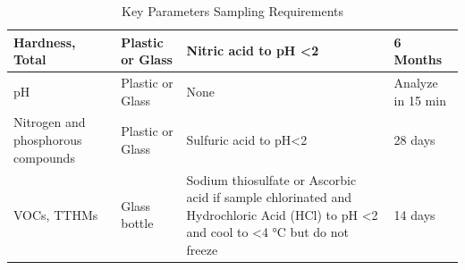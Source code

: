 \documentclass{article}
\begin{document}
\begin{table}[h!]
\begin{tabular}{|p{4cm}|p{3cm}|p{4cm}|p{3cm}|}
Hardness, Total                                                                            & Plastic or Glass                                                                   & Nitric   acid to pH \textless 2                                                                                                                              & 6 Months                                                            \\ \hline
pH                                                                                         & Plastic or Glass                                                                   & None                                                                                                                                                         & Analyze in 15 min                                                    \\ \hline
Nitrogen and   phosphorous compounds                                                       & Plastic or Glass                                                                   & Sulfuric acid to   pH\textless{}2                                                                                                                            & 28 days                                                             \\ \hline
VOCs, TTHMs                                                                                & Glass bottle                                                                       & Sodium thiosulfate or   Ascorbic acid if sample chlorinated and Hydrochloric Acid (HCl) to pH \textless 2  and cool to  \textless 4 °C  but do not freeze & 14 days                                                             \\ \hline
\end{tabular}
\caption*{Key Parameters Sampling Requirements}
\end{table}
\newpage
\end{document}
